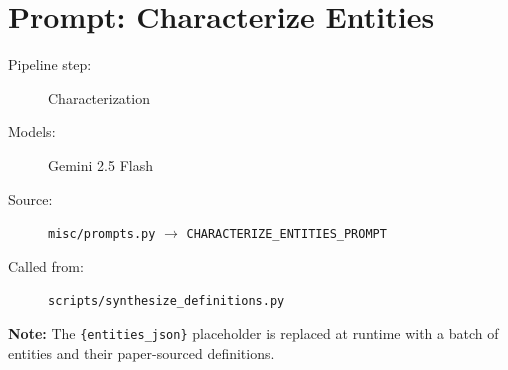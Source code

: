 \section*{Prompt: Characterize Entities}
\begin{description}
\item[Pipeline step:] Characterization
\item[Models:] Gemini 2.5 Flash
\item[Source:] \texttt{misc/prompts.py} $\rightarrow$ \texttt{CHARACTERIZE\_ENTITIES\_PROMPT}
\item[Called from:] \texttt{scripts/synthesize\_definitions.py}
\end{description}
\begin{tcolorbox}[colback=yellow!8,colframe=yellow!50!black,left=4pt,right=4pt,top=4pt,bottom=4pt,arc=2pt]
\textbf{Note:} The \texttt{\{entities\_json\}} placeholder is replaced at runtime with a batch of entities and their paper-sourced definitions.
\end{tcolorbox}

